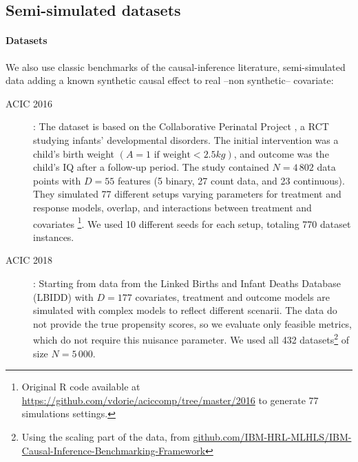\documentclass{report}
\begin{document}
\subsection{Semi-simulated datasets}\label{subsec:causal_model_selection:semi_simulated}

\paragraph{Datasets}

We also use classic benchmarks of the causal-inference
literature, semi-simulated data adding a known synthetic causal effect to real --non synthetic-- covariate:
\begin{description}
  \item[ACIC 2016] \citep{dorie_automated_2019}: The dataset is based on the
    Collaborative Perinatal Project \citep{niswander_women_1972}, a RCT
    studying infants’
    developmental disorders. The initial intervention was a child’s birth
    weight $(A = 1 \text{ if weight} < 2.5 kg)$, and outcome was the child’s
    IQ after a follow-up period. The study contained $N=4\,802$ data
    points with $D=55$ features (5 binary, 27 count data, and 23
    continuous). They simulated 77 different setups varying parameters
    for treatment and response models, overlap, and interactions between treatment and
    covariates \footnote{Original R code available at
      \url{https://github.com/vdorie/aciccomp/tree/master/2016}
      to generate 77 simulations settings.}. We used 10 different seeds for
    each setup, totaling 770 dataset instances.

  \item[ACIC 2018] \citep{shimoni_benchmarking_2018}: Starting from data
    from the Linked Births and Infant Deaths Database (LBIDD)
    \citep{macdorman_infant_1998} with $D=177$ covariates, treatment and
    outcome models are simulated with complex models to reflect
    different scenarii. The data do not provide the true propensity
    scores, so we evaluate only feasible metrics, which do not require this
    nuisance parameter. We used all 432 datasets\footnote{Using the scaling part of the data, from
      \href{https://github.com/IBM-HRL-MLHLS/IBM-Causal-Inference-Benchmarking-Framework}{github.com/IBM-HRL-MLHLS/IBM-Causal-Inference-Benchmarking-Framework}} of size $N=5\,000$.



\end{description}
\end{document}
